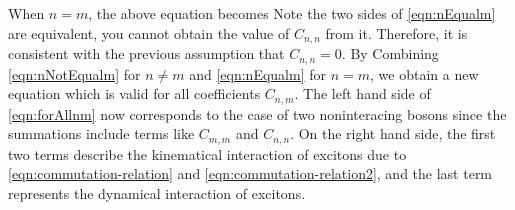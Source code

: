 When $n=m$, the above equation becomes
Note the two sides of  \autoref{eqn:nEqualm} are equivalent, you cannot obtain the value of $C_{n,n}$ from it. 
Therefore, it is consistent with the previous assumption that $C_{n,n} = 0$. 
By Combining \autoref{eqn:nNotEqualm} for $n\neq m$ and \autoref{eqn:nEqualm} for $n = m$, we obtain a new 
equation 
which is valid for all coefficients $C_{n, m}$. The left hand side of \autoref{eqn:forAllnm} now corresponds to the case 
of two noninteracing bosons since the summations include terms like $C_{m,m}$ and $C_{n,n}$. On the right hand side,
 the first two terms describe the kinematical interaction of excitons due to \autoref{eqn:commutation-relation} and
 \autoref{eqn:commutation-relation2}, and the last term represents the dynamical interaction of excitons.

